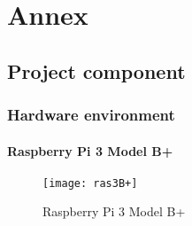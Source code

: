%
%
\chapter{Annex}

\section{Project component}
\subsection{Hardware environment}
\subsubsection{Raspberry Pi 3 Model B+}
\FloatBarrier
\begin{figure}[h]
         \centering
        \texttt{[image: ras3B+]}
   
        \caption{Raspberry Pi 3 Model B+ }
        \label{Raspberry Pi 3 Model B+ }
    \end{figure}
\FloatBarrier
\FloatBarrier
